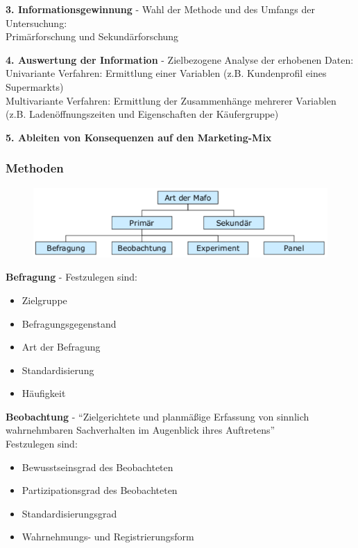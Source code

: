 \documentclass[a4paper,11pt, twoside]{article}
\begin{document}
\textbf{3. Informationsgewinnung} - Wahl der Methode und des Umfangs der Untersuchung:\\
Primärforschung und Sekundärforschung

\textbf{4. Auswertung der Information} - Zielbezogene Analyse der erhobenen Daten:\\
Univariante Verfahren: Ermittlung einer Variablen (z.B. Kundenprofil eines Supermarkts)\\
Multivariante Verfahren: Ermittlung der Zusammenhänge mehrerer Variablen (z.B. Ladenöffnungszeiten und Eigenschaften der Käufergruppe)

\textbf{5. Ableiten von Konsequenzen auf den Marketing-Mix}

\subsubsection*{Methoden}

\begin{figure}[h]
 \begin{center}
   \includegraphics[scale=0.3]{bilder/methoden.png}
 \end{center}
\end{figure}
\textbf{Befragung} - Festzulegen sind:
\begin{itemize}
	\item Zielgruppe
	\item Befragungsgegenstand
	\item Art der Befragung
	\item Standardisierung
	\item Häufigkeit
\end{itemize}

\textbf{Beobachtung} - "`Zielgerichtete und planmäßige Erfassung von sinnlich wahrnehmbaren Sachverhalten im Augenblick ihres Auftretens"'\\
Festzulegen sind:
\begin{itemize}
	\item Bewusstseinsgrad des Beobachteten
	\item Partizipationsgrad des Beobachteten
	\item Standardisierungsgrad
	\item Wahrnehmungs- und Registrierungsform
\end{itemize}
\end{document}
